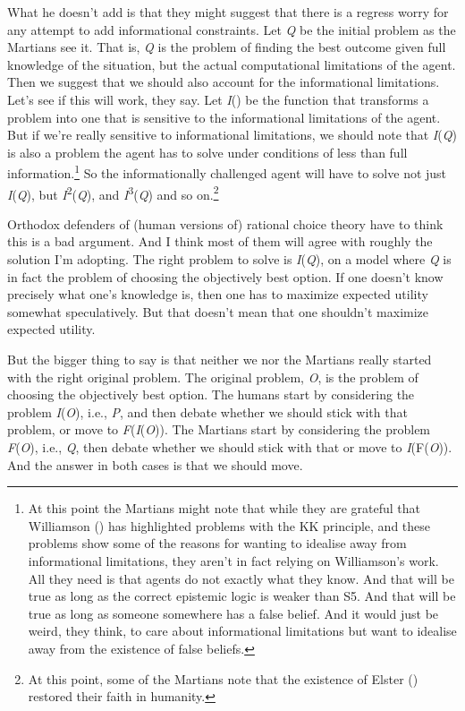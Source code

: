 \documentclass[
  11pt,
  letterpaper,
  DIV=11,
  numbers=noendperiod,
  twoside]{scrartcl}
\begin{document}
What he doesn't add is that they might suggest that there is a regress
worry for any attempt to add informational constraints. Let \emph{Q} be
the initial problem as the Martians see it. That is, \emph{Q} is the
problem of finding the best outcome given full knowledge of the
situation, but the actual computational limitations of the agent. Then
we suggest that we should also account for the informational
limitations. Let's see if this will work, they say. Let \emph{I}() be
the function that transforms a problem into one that is sensitive to the
informational limitations of the agent. But if we're really sensitive to
informational limitations, we should note that \emph{I}(\emph{Q}) is
also a problem the agent has to solve under conditions of less than full
information.\footnote{At this point the Martians might note that while
  they are grateful that Williamson
  () has highlighted problems with
  the KK principle, and these problems show some of the reasons for
  wanting to idealise away from informational limitations, they aren't
  in fact relying on Williamson's work. All they need is that agents do
  not exactly what they know. And that will be true as long as the
  correct epistemic logic is weaker than S5. And that will be true as
  long as someone somewhere has a false belief. And it would just be
  weird, they think, to care about informational limitations but want to
  idealise away from the existence of false beliefs.} So the
informationally challenged agent will have to solve not just
\emph{I}(\emph{Q}), but \emph{I}\textsuperscript{2}(\emph{Q}), and
\emph{I}\textsuperscript{3}(\emph{Q}) and so on.\footnote{At this point,
  some of the Martians note that the existence of Elster
  () restored their faith in humanity.}

Orthodox defenders of (human versions of) rational choice theory have to
think this is a bad argument. And I think most of them will agree with
roughly the solution I'm adopting. The right problem to solve is
\emph{I}(\emph{Q}), on a model where \emph{Q} is in fact the problem of
choosing the objectively best option. If one doesn't know precisely what
one's knowledge is, then one has to maximize expected utility somewhat
speculatively. But that doesn't mean that one shouldn't maximize
expected utility.

But the bigger thing to say is that neither we nor the Martians really
started with the right original problem. The original problem, \emph{O},
is the problem of choosing the objectively best option. The humans start
by considering the problem \emph{I}(\emph{O}), i.e., \emph{P}, and then
debate whether we should stick with that problem, or move to
\emph{F}(\emph{I}(\emph{O})). The Martians start by considering the
problem \emph{F}(\emph{O}), i.e., \emph{Q}, then debate whether we
should stick with that or move to \emph{I}(F(\emph{O})). And the answer
in both cases is that we should move.
\end{document}
